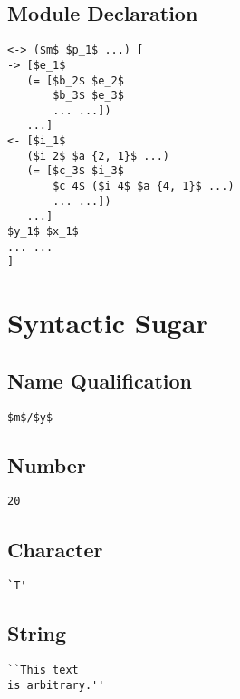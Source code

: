 \documentclass{article}
\begin{document}
\begin{multicols}
\subsection*{Module Declaration}
\begin{lstlisting}[mathescape]
<-> ($m$ $p_1$ ...) [
-> [$e_1$
   (= [$b_2$ $e_2$
       $b_3$ $e_3$
       ... ...])
   ...]
<- [$i_1$
   ($i_2$ $a_{2, 1}$ ...)
   (= [$c_3$ $i_3$
       $c_4$ ($i_4$ $a_{4, 1}$ ...)
       ... ...])
   ...]
$y_1$ $x_1$
... ...
]
\end{lstlisting}

\columnbreak

\section*{Syntactic Sugar}

\subsection*{Name Qualification}
\begin{lstlisting}[mathescape]
$m$/$y$
\end{lstlisting}

\subsection*{Number}
\begin{lstlisting}[mathescape]
20
\end{lstlisting}

\subsection*{Character}
\begin{lstlisting}[mathescape]
`T'
\end{lstlisting}

\subsection*{String}
\begin{lstlisting}[mathescape]
``This text
is arbitrary.''
\end{lstlisting}


\end{multicols}
\end{document}
